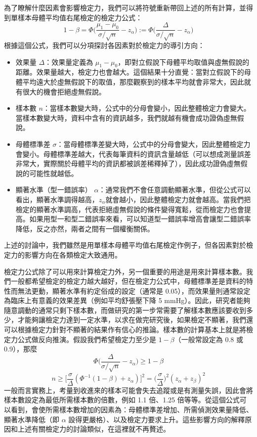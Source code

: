     為了瞭解什麼因素會影響檢定力，我們可以將符號重新帶回上述的所有計算，並得到單樣本母體平均值右尾檢定的檢定力公式：
    \smallskip
    \[1-\beta = \Phi\Big(\frac{\mu_1-\mu_0}{\sigma/\sqrt{n}}-z_\alpha\Big) := \Phi\Big(\frac{\Delta}{\sigma/\sqrt{n}}-z_\alpha\Big)\]
    \smallskip
    根據這個公式，我們可以分項探討各因素對於檢定力的導引方向：
    \begin{itemize}
        \item 效果量 $\Delta$：效果量定義為 $\mu_1-\mu_0$，即對立假說下母體平均取值與虛無假說的距離。效果量越大，檢定力也會越大。這個結果十分直覺：當對立假說下的母體平均遠大於虛無假說下的取值，那麼觀察到的樣本平均就會非常大，因此就有很大的機會拒絕虛無假說。
        \item 樣本數 $n$：當樣本數變大時，公式中的分母會變小，因此整體檢定力會變大。當樣本數變大時，資料中含有的資訊越多，我們就越有機會成功證偽虛無假說。
        \item 母體標準差 $\sigma$：當母體標準差變大時，公式中的分母會變大，因此整體檢定力會變小。母體標準差越大，代表每筆資料的資訊含量越低（可以想成測量誤差非常大，實際關於母體平均的資訊都被誤差稀釋掉了），因此成功證偽虛無假說的可能性就越低。
        \item 顯著水準（型一錯誤率） $\alpha$：通常我們不會任意調動顯著水準，但從公式可以看出，顯著水準調得越高，$z_\alpha$就會越小，因此整體檢定力就會越高。當我們把檢定的顯著水準調高，代表拒絕虛無假說的條件變得寬鬆，從而檢定力也會提高。如果用型一和型二錯誤率來看，可以知道型一錯誤率增高會讓型二錯誤率降低，反之亦然，兩者之間有一個權衡關係。
    \end{itemize}
    上述的討論中，我們雖然是用單樣本母體平均值右尾檢定作例子，但各因素對於檢定力的影響方向在各類檢定大致通用。

    \medskip

    檢定力公式除了可以用來計算檢定力外，另一個重要的用途是用來計算樣本數。我們一般都希望檢定的檢定力越大越好，但在檢定力公式中，母體標準差是資料的特性而無法更動，顯著水準有約定俗成的設定（通常是 0.05），而效果量則通常設定為臨床上有意義的效果差異（例如平均舒張壓下降 5 mmHg）。因此，研究者能夠隨意調動的通常只剩下樣本數，而做研究的第一步常需要了解樣本數應該要收到多少，才能夠讓檢定力達到一定水準，以求在做完研究後，如果檢定不顯著，我們還可以根據檢定力針對不顯著的結果作有信心的推論。樣本數的計算基本上就是將檢定力公式做反向推演。假設我們希望檢定力至少是 $1-\beta$（一般常設定為 0.8 或 0.9），那麼
    \smallskip
    \[\Phi\Big(\frac{\Delta}{\sigma/\sqrt{n}}-z_\alpha\Big) \ge 1-\beta\]
    \[n \ge \Big[\frac{\sigma}{\Delta} (\Phi^{-1}(1-\beta) + z_\alpha)\Big]^2 = \Big(\frac{\sigma}{\Delta}\Big)^2(z_\alpha + z_\beta)^2\]
    \smallskip
    一般而言實務上，考量到收進來的樣本可能會失去追蹤或是有測量失誤，因此會將樣本數設定為最低所需樣本數的倍數，例如 1.1 倍、1.25 倍等等。從這個公式可以看到，會使所需樣本數增加的因素為：母體標準差增加、所需偵測效果量降低、顯著水準降低（即 $\alpha$ 設得更嚴格）、以及檢定力要求上升。這些影響方向的解釋原因和上述有關檢定力的討論類似，在這裡就不再贅述。

